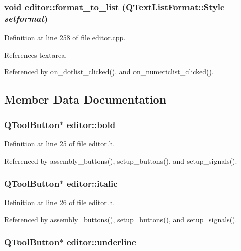 \subsubsection{\setlength{\rightskip}{0pt plus 5cm}void editor::format\_\-to\_\-list (QText\-List\-Format::Style {\em setformat})\hspace{0.3cm}{\tt  [private]}}\label{classeditor_b520554f03b1f30053a221a9a4e7a543}




Definition at line 258 of file editor.cpp.

References textarea.

Referenced by on\_\-dotlist\_\-clicked(), and on\_\-numericlist\_\-clicked().

\subsection{Member Data Documentation}
\subsubsection{\setlength{\rightskip}{0pt plus 5cm}QTool\-Button$\ast$ {\bf editor::bold}}\label{classeditor_58d14c003be79c0536f89dd79489c688}




Definition at line 25 of file editor.h.

Referenced by assembly\_\-buttons(), setup\_\-buttons(), and setup\_\-signals().
\subsubsection{\setlength{\rightskip}{0pt plus 5cm}QTool\-Button$\ast$ {\bf editor::italic}}\label{classeditor_0202c2b3b324f636b746e90a073bbc77}




Definition at line 26 of file editor.h.

Referenced by assembly\_\-buttons(), setup\_\-buttons(), and setup\_\-signals().
\subsubsection{\setlength{\rightskip}{0pt plus 5cm}QTool\-Button$\ast$ {\bf editor::underline}}\label{classeditor_8be5b2324c4165e42da1979d0dbed35a}




